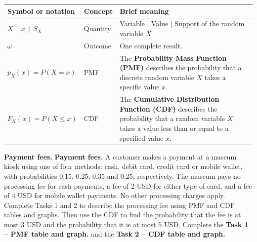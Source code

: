 \noindent%
\begin{tabularx}{\linewidth}{@{}l l X@{}}%
  \toprule
  Symbol or notation & Concept & Brief meaning\\%
  \midrule
  $X \>\> | \>\> x \>\> | \>\> S_X$ & Quantity & Variable |
  Value | Support of the random variable $X$\\
  $\omega$ & Outcome & One complete result.\\
  $p_X(x) = P(X=x)$ & PMF & The \textbf{Probability Mass Function (PMF)} describes the
  probability that a discrete random variable $X$ takes a specific value $x$. \\
  $F_X(x)= P(X \leq x)$ & CDF & The \textbf{Cumulative Distribution Function (CDF)}
  describes the probability that a random variable $X$ takes a value less than or equal to a specified value
  $x$.\\%
  \bottomrule
\end{tabularx}



 \vspace{-5mm}
\begingroup\small
\textbf{Payment fees.} \textbf{Payment fees.} A customer makes a payment at a museum kiosk using one of four methods: cash, debit
card, credit card or mobile wallet, with probabilities 0.15, 0.25, 0.35 and 0.25, respectively. The museum
pays no processing fee for cash payments, a fee of 2 USD for either type of card, and a fee of 4 USD for
mobile wallet payments. No other processing charges apply. Complete Tasks 1 and 2 to describe the
processing fee using PMF and CDF tables and graphs. Then use the CDF to find the probability that the fee
is at most 3 USD and the probability that it is at most 5 USD.  Complete the \textbf{Task 1 -- PMF table and graph.} and the \textbf{Task 2 -- CDF table and graph.}

